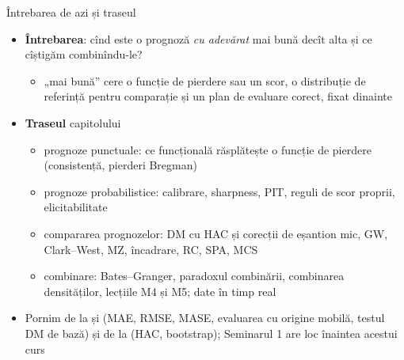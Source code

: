 \begin{frame}{Întrebarea de azi și traseul}
\itemsize{\small}
\begin{itemize}
    \item \textbf{Întrebarea}: cînd este o prognoză \emph{cu adevărat} mai bună decît alta și ce cîștigăm combinîndu-le?
    \begin{itemize}
        \item „mai bună” cere o funcție de pierdere sau un scor, o distribuție de referință pentru comparație și un plan de evaluare corect, fixat dinainte
    \end{itemize}
    \item \textbf{Traseul} capitolului
    \begin{itemize}
        \item prognoze punctuale: ce funcțională răsplătește o funcție de pierdere (consistență, pierderi Bregman)
        \item prognoze probabilistice: calibrare, sharpness, PIT, reguli de scor proprii, elicitabilitate
        \item compararea prognozelor: DM cu HAC și corecții de eșantion mic, GW, Clark--West, MZ, încadrare, RC, SPA, MCS
        \item combinare: Bates--Granger, paradoxul combinării, combinarea densităților, lecțiile M4 și M5; date în timp real
    \end{itemize}
    \item Pornim de la  și  (MAE, RMSE, MASE, evaluarea cu origine mobilă, testul DM de bază) și de la  (HAC, bootstrap); Seminarul 1 are loc înaintea acestui curs
\end{itemize}
\end{frame}

